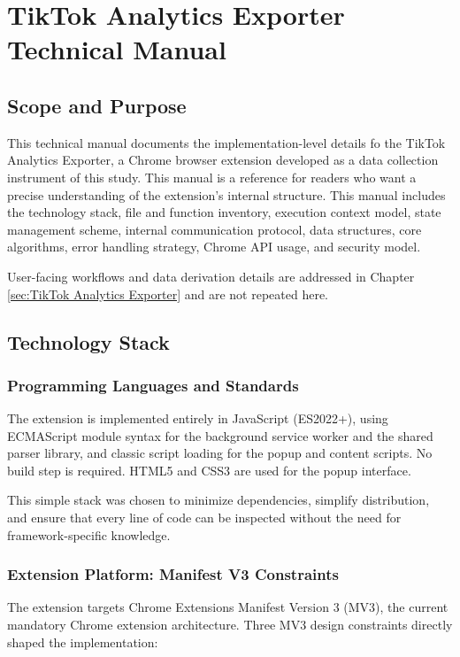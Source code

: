 \chapter{TikTok Analytics Exporter Technical Manual}
\label{sec:appendixc}

\section{Scope and Purpose}

This technical manual documents the implementation-level details fo the TikTok Analytics Exporter, a Chrome browser extension developed as a data collection instrument of this study. This manual is a reference for readers who want a precise understanding of the extension's internal structure. This manual includes the technology stack, file and function inventory, execution context model, state management scheme, internal communication protocol, data structures, core algorithms, error handling strategy, Chrome API usage, and security model.

User-facing workflows and data derivation details are addressed in Chapter \ref{sec:TikTok Analytics Exporter} and are not repeated here.

\section{Technology Stack}

\subsection{Programming Languages and Standards}

The extension is implemented entirely in JavaScript (ES2022+), using ECMAScript module syntax for the background service worker and the shared parser library, and classic script loading for the popup and content scripts. No build step is required. HTML5 and CSS3 are used for the popup interface.

This simple stack was chosen to minimize dependencies, simplify distribution, and ensure that every line of code can be inspected without the need for framework-specific knowledge.

\subsection{Extension Platform: Manifest V3 Constraints}

The extension targets Chrome Extensions Manifest Version 3 (MV3), the current mandatory Chrome extension architecture. Three MV3 design constraints directly shaped the implementation:

